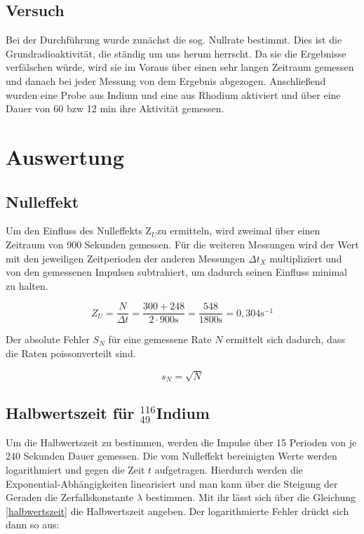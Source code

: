 	\subsection{Versuch}
Bei der Durchführung wurde zunächst die sog. Nullrate bestimmt. Dies ist die Grundradioaktivität, die ständig um uns herum herrscht. Da sie die Ergebnisse verfälschen würde, wird sie im Voraus über einen sehr langen Zeitraum gemessen und danach bei jeder Messung von dem Ergebnis abgezogen.
Anschließend wurden eine Probe aus Indium und eine aus Rhodium aktiviert und über eine Dauer von 60 bzw 12 min ihre Aktivität gemessen.

\section{Auswertung}
\subsection{Nulleffekt}
Um den Einfluss des Nulleffekts Z$_U$zu ermitteln, wird zweimal über einen Zeitraum von 900 Sekunden gemessen. Für
die weiteren Messungen wird der Wert mit den jeweiligen Zeitperioden der anderen Messungen $\Delta t_X$ multipliziert und
von den gemessenen Impulsen subtrahiert, um dadurch seinen Einfluss minimal zu halten. 

\begin{equation}
 Z_U = \frac{N}{\Delta t} = \frac{300 + 248}{2 \cdot 900 \text{s}} = \frac{548}{1800 \text{s}} = 0,304 \text{s}^{-1}
\end{equation}

Der absolute Fehler $S_N$ für eine gemessene Rate $N$ ermittelt sich dadurch, dass die Raten poissonverteilt sind.

\begin{equation}
 s_N = \sqrt{N}
\end{equation}

\subsection{Halbwertszeit für $^{116}_{49}$Indium}
Um die Halbwertszeit zu bestimmen, werden die Impulse über 15 Perioden von je 240 Sekunden Dauer gemessen. Die vom
Nulleffekt bereinigten Werte werden logarithmiert und gegen die Zeit $t$ aufgetragen. Hierdurch werden die Exponential-Abhängigkeiten linearisiert und man kann über die Steigung der Geraden die Zerfallskonstante $\lambda$ bestimmen. Mit ihr lässt sich
über die Gleichung \eqref{halbwertszeit} die Halbwertszeit angeben. Der logarithmierte Fehler drückt sich dann so aus:

